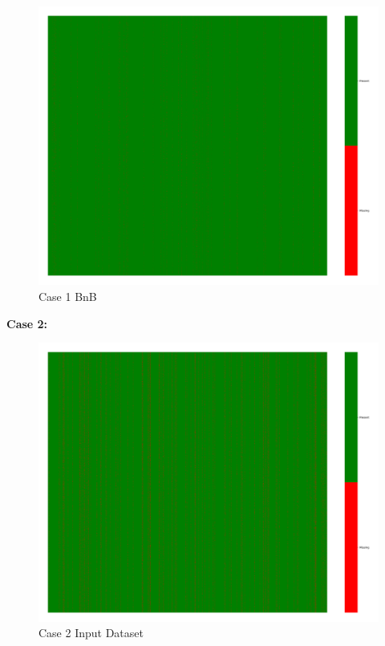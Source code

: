 \documentclass[a4paper,12pt]{article}
\begin{document}
\begin{figure}[H]
    \includegraphics[width=\linewidth]{case1_bnb_heatmap_cleaned.png}
    \caption*{Case 1 BnB}
\end{figure}

\textbf{Case 2:}
\begin{figure}[H]
    \centering
    \includegraphics[width=\linewidth]{case2_heatmap_erased.png}
    \caption*{Case 2 Input Dataset}
\end{figure}
\end{document}
